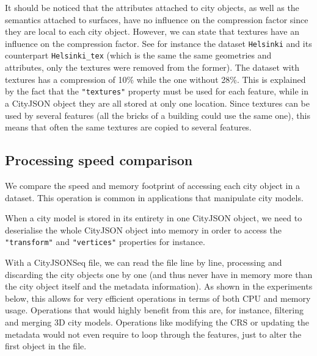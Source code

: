\documentclass{isprs} %
\begin{document}
%

It should be noticed that the attributes attached to city objects, as well as the semantics attached to surfaces, have no influence on the compression factor since they are local to each city object.
However, we can state that textures have an influence on the compression factor.
See for instance the dataset \texttt{Helsinki} and its counterpart \texttt{Helsinki\_tex} (which is the same the same geometries and attributes, only the textures were removed from the former).
The dataset with textures has a compression of 10\% while the one without 28\%.
This is explained by the fact that the \texttt{"textures"} property must be used for each feature, while in a CityJSON object they are all stored at only one location.
Since textures can be used by several features (all the bricks of a building could use the same one), this means that often the same textures are copied to several features.


\subsection{Processing speed comparison}

We compare the speed and memory footprint of accessing each city object in a dataset.
This operation is common in applications that manipulate city models.

When a city model is stored in its entirety in one CityJSON object, we need to deserialise the whole CityJSON object into memory in order to access the \texttt{"transform"} and \texttt{"vertices"} properties for instance.

With a CityJSONSeq file, we can read the file line by line, processing and discarding the city objects one by one (and thus never have in memory more than the city object itself and the metadata information).
As shown in the experiments below, this allows for very efficient operations in terms of both CPU and memory usage.
Operations that would highly benefit from this are, for instance, filtering and merging 3D city models.
Operations like modifying the CRS or updating the metadata would not even require to loop through the features, just to alter the first object in the file.

%
\end{document}
